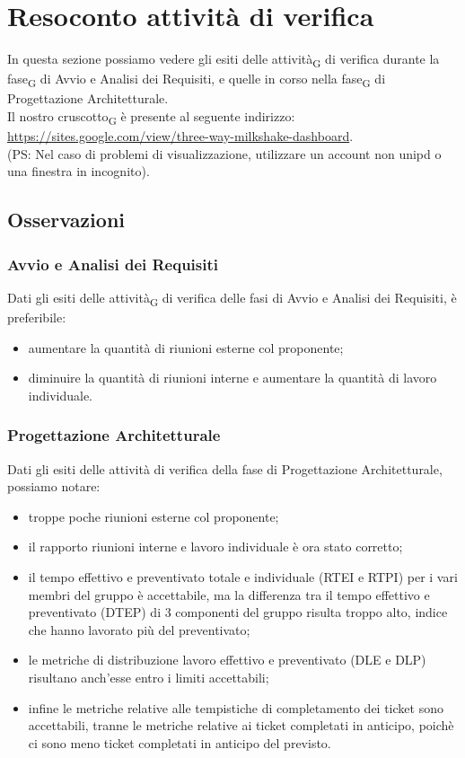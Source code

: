 
\section{Resoconto {attività} di verifica}
In questa sezione possiamo vedere gli esiti delle attività\textsubscript{G} di verifica durante la fase\textsubscript{G} di Avvio e Analisi dei Requisiti, e quelle in corso nella fase\textsubscript{G} di Progettazione Architetturale.\\
Il nostro cruscotto\textsubscript{G} è presente al seguente indirizzo:\\ \url{https://sites.google.com/view/three-way-milkshake-dashboard}.\\ (PS: Nel caso di problemi di visualizzazione, utilizzare un account non unipd o una finestra in incognito).
\pagebreak
\subsection{Osservazioni}
\subsubsection{Avvio e Analisi dei Requisiti}
Dati gli esiti delle attività\textsubscript{G} di verifica delle fasi di Avvio e Analisi dei Requisiti, è preferibile:
\begin{itemize}
	\item aumentare la quantità di riunioni esterne col proponente;
	\item diminuire la quantità di riunioni interne e aumentare la quantità di lavoro individuale.
\end{itemize}
\subsubsection{Progettazione Architetturale}
Dati gli esiti delle attività di verifica della fase di Progettazione Architetturale, possiamo notare:
\begin{itemize}
	\item troppe poche riunioni esterne col proponente;
	\item il rapporto riunioni interne e lavoro individuale è ora stato corretto;
	\item il tempo effettivo e preventivato totale e individuale (RTEI e RTPI) per i vari membri del gruppo è accettabile, ma la differenza tra il tempo effettivo e preventivato (DTEP) di 3 componenti del gruppo risulta troppo alto, indice che hanno lavorato più del preventivato;
	\item le metriche di distribuzione lavoro effettivo e preventivato (DLE e DLP) risultano anch'esse entro i limiti accettabili;
	\item infine le metriche relative alle tempistiche di completamento dei ticket sono accettabili, tranne le metriche relative ai ticket completati in anticipo, poichè ci sono meno ticket completati in anticipo del previsto.
\end{itemize}